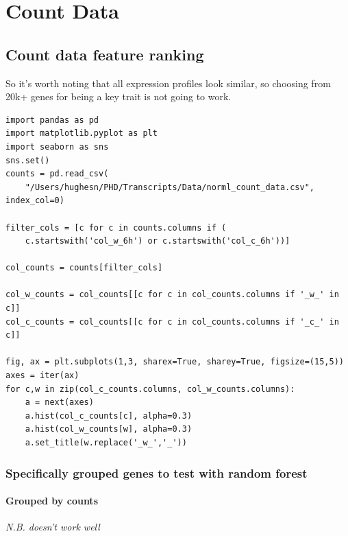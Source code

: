 \documentclass[11pt]{article}
\begin{document}
\section{Count Data}
\label{sec:org885665a}

\subsection{Count data feature ranking}
\label{sec:orgff796bf}

So it's worth noting that all expression profiles look similar, so choosing from 20k+ genes for being a key trait is not going to work.\\

\begin{verbatim}
import pandas as pd
import matplotlib.pyplot as plt
import seaborn as sns
sns.set()
counts = pd.read_csv(
    "/Users/hughesn/PHD/Transcripts/Data/norml_count_data.csv", index_col=0)

filter_cols = [c for c in counts.columns if (
    c.startswith('col_w_6h') or c.startswith('col_c_6h'))]

col_counts = counts[filter_cols]

col_w_counts = col_counts[[c for c in col_counts.columns if '_w_' in c]]
col_c_counts = col_counts[[c for c in col_counts.columns if '_c_' in c]]

fig, ax = plt.subplots(1,3, sharex=True, sharey=True, figsize=(15,5))
axes = iter(ax)
for c,w in zip(col_c_counts.columns, col_w_counts.columns):
    a = next(axes)
    a.hist(col_c_counts[c], alpha=0.3)
    a.hist(col_w_counts[w], alpha=0.3)
    a.set_title(w.replace('_w_','_'))
\end{verbatim}


\subsubsection{Specifically grouped genes to test with random forest}
\label{sec:orgb7cb937}
\paragraph{Grouped by counts}
\label{sec:org65cdcce}
\emph{N.B. doesn't work well}\\
\end{document}

